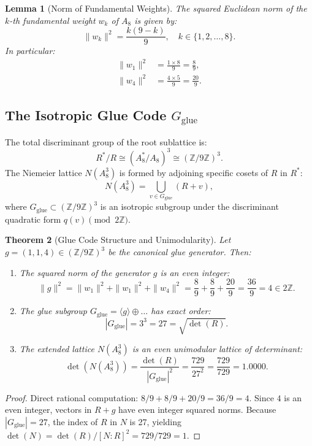 \documentclass[11pt,a4paper]{article}
\newtheorem{theorem}{Theorem}
\newtheorem{lemma}[theorem]{Lemma}
\begin{document}
\begin{lemma}[Norm of Fundamental Weights]
The squared Euclidean norm of the $k$-th fundamental weight $w_k$ of $A_8$ is given by:
\begin{equation}
\|w_k\|^2 = \frac{k(9 - k)}{9}, \quad k \in \{1, 2, \dots, 8\}.
\end{equation}
In particular:
\begin{align}
\|w_1\|^2 &= \frac{1 \times 8}{9} = \frac{8}{9}, \\
\|w_4\|^2 &= \frac{4 \times 5}{9} = \frac{20}{9}.
\end{align}
\end{lemma}

\subsection{The Isotropic Glue Code $G_{\text{glue}}$}
The total discriminant group of the root sublattice is:
\begin{equation}
R^* / R \cong (A_8^* / A_8)^3 \cong (\mathbb{Z}/9\mathbb{Z})^3.
\end{equation}
The Niemeier lattice $N(A_8^3)$ is formed by adjoining specific cosets of $R$ in $R^*$:
\begin{equation}
N(A_8^3) = \bigcup_{v \in G_{\text{glue}}} (R + v),
\end{equation}
where $G_{\text{glue}} \subset (\mathbb{Z}/9\mathbb{Z})^3$ is an isotropic subgroup under the discriminant quadratic form $q(v) \pmod{2\mathbb{Z}}$.

\begin{theorem}[Glue Code Structure and Unimodularity]
Let $g = (1, 1, 4) \in (\mathbb{Z}/9\mathbb{Z})^3$ be the canonical glue generator. Then:
\begin{enumerate}
    \item The squared norm of the generator $g$ is an even integer:
    \begin{equation}
    \|g\|^2 = \|w_1\|^2 + \|w_1\|^2 + \|w_4\|^2 = \frac{8}{9} + \frac{8}{9} + \frac{20}{9} = \frac{36}{9} = 4 \in 2\mathbb{Z}.
    \end{equation}
    \item The glue subgroup $G_{\text{glue}} = \langle g \rangle \oplus \dots$ has exact order:
    \begin{equation}
    |G_{\text{glue}}| = 3^3 = 27 = \sqrt{\det(R)}.
    \end{equation}
    \item The extended lattice $N(A_8^3)$ is an even unimodular lattice of determinant:
    \begin{equation}
    \det(N(A_8^3)) = \frac{\det(R)}{|G_{\text{glue}}|^2} = \frac{729}{27^2} = \frac{729}{729} = 1.0000.
    \end{equation}
\end{enumerate}
\end{theorem}
\begin{proof}
Direct rational computation: $8/9 + 8/9 + 20/9 = 36/9 = 4$. Since $4$ is an even integer, vectors in $R + g$ have even integer squared norms. Because $|G_{\text{glue}}| = 27$, the index of $R$ in $N$ is 27, yielding $\det(N) = \det(R) / [N : R]^2 = 729 / 729 = 1$.
\end{proof}
\end{document}
